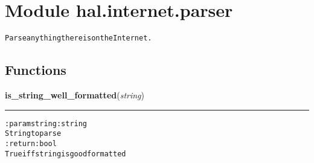 %
%
%


\section{Module hal.internet.parser}

    \label{hal:internet:parser}
\begin{alltt}
Parse anything there is on the Internet. 
\end{alltt}



  \subsection{Functions}

    \label{hal:internet:parser:is_string_well_formatted}

    \vspace{0.5ex}

\hspace{.8\funcindent}\begin{boxedminipage}{\funcwidth}

    \raggedright \textbf{is\_string\_well\_formatted}(\textit{string})

    \vspace{-1.5ex}

    \rule{\textwidth}{0.5\fboxrule}
\setlength{\parskip}{2ex}
\begin{alltt}

:param string: string
    String to parse
:return: bool
    True iff string is good formatted
\end{alltt}

\setlength{\parskip}{1ex}
    \end{boxedminipage}

